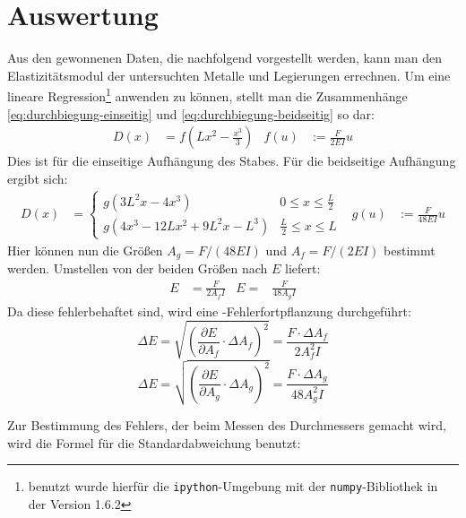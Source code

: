 
\section{Auswertung}

Aus den gewonnenen Daten, die nachfolgend vorgestellt werden, kann man
den Elastizitätsmodul der untersuchten Metalle und Legierungen
errechnen. Um eine lineare Regression\footnote{benutzt wurde hierfür die
  \texttt{ipython}-Umgebung mit der \texttt{numpy}-Bibliothek in der
  Version 1.6.2} anwenden zu können, stellt man die Zusammenhänge
\eqref{eq:durchbiegung-einseitig} und \eqref{eq:durchbiegung-beidseitig}
so dar:
%
\begin{align}
  \label{eq:lineare-durchbiegung-einseitig}
  D(x) &= f(Lx^2-\frac{x^3}{3}) & f(u) &:= \frac{F}{2EI}u
\end{align}
Dies ist für die einseitige Aufhängung des Stabes. Für die beidseitige
Aufhängung ergibt sich:
\begin{align}
  \label{eq:lineare-durchbiegung-beidseitig}
  D(x) &= \begin{cases}
    g(3L^2x-4x^3) & 0\le x\le \frac{L}{2}\\
    g(4x^3-12Lx^2 + 9L^2x - L^3) & \frac{L}{2}\le x\le L
  \end{cases}
  & g(u) &:= \frac{F}{48EI}u
\end{align}
%
Hier können nun die Größen $A_g = F/(48EI)$ und $A_f = F/(2EI)$ bestimmt
werden. Umstellen von der beiden Größen nach $E$ liefert:
\begin{align}
  \label{eq:e-modul}
  E &= \frac{F}{2A_fI} & E =& \frac{F}{48A_gI}
\end{align}
Da diese fehlerbehaftet sind, wird eine -Fehlerfortpflanzung
durchgeführt:
%
\begin{equation}
  \label{eq:gaussfehler-f}
  \Delta E = \sqrt{\left(\frac{\partial E}{\partial A_f}
      \cdot\Delta A_f\right)^2}
  = \frac{F\cdot\Delta A_f}{2A_f^2I}
\end{equation}
%
\begin{equation}
  \label{eq:gaussfehler-g}
  \Delta E = \sqrt{\left(\frac{\partial E}{\partial A_g}\cdot\Delta
      A_g\right)^2}
  = \frac{F\cdot\Delta A_g}{48A^2_gI}
\end{equation}

Zur Bestimmung des Fehlers, der beim Messen des Durchmessers gemacht
wird, wird die Formel für die Standardabweichung benutzt:

